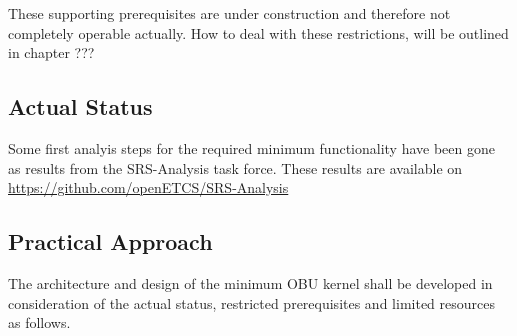 These supporting prerequisites are under construction and therefore not completely operable actually. How to deal with these restrictions, will be outlined in chapter ???

\subsection{Actual Status}
\label{sec:ActualStatus}

Some first analyis steps for the required minimum functionality have been gone as results from the SRS-Analysis task force. These results are available on \url{https://github.com/openETCS/SRS-Analysis}


\subsection{Practical Approach}
\label{sec:PracticalApproach}

The architecture and design of the minimum OBU kernel shall be developed in consideration of the actual status, restricted prerequisites and limited resources as follows. 
